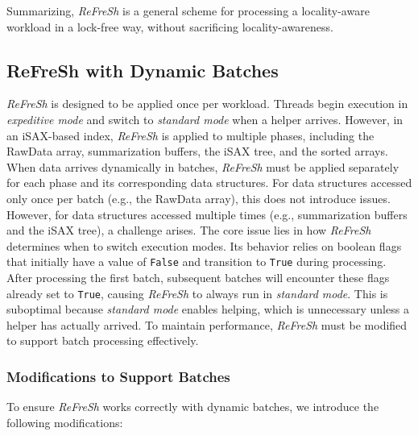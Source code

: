 \documentclass[a4paper,11pt,twoside,openany]{book}
\begin{document}
Summarizing, \textit{ReFreSh} is a general scheme for processing a locality-aware workload in a
lock-free way, without sacrificing locality-awareness. 

\subsection{\textbf{ReFreSh with Dynamic Batches}}  

\textit{ReFreSh} is designed to be applied once per workload. Threads begin execution in 
\textit{expeditive mode} and switch to \textit{standard mode} when a helper arrives. However,
in an iSAX-based index, \textit{ReFreSh} is applied to multiple phases, including the
RawData array, summarization buffers, the iSAX tree, and the sorted arrays.  
When data arrives dynamically in batches, \textit{ReFreSh} must be applied separately for each phase
and its corresponding data structures. For data structures accessed only once per batch (e.g.,
the RawData array), this does not introduce issues. However, for data structures accessed
multiple times (e.g., summarization buffers and the iSAX tree), a challenge arises.  
% 
The core issue lies in how \textit{ReFreSh} determines when to switch execution modes.
Its behavior relies on boolean flags that initially have a value of \texttt{False} and transition
to \texttt{True} during processing. After processing the first batch, subsequent batches will
encounter these flags already set to \texttt{True}, causing \textit{ReFreSh} to always run
in \textit{standard mode}. This is suboptimal because \textit{standard mode} enables helping,
which is unnecessary unless a helper has actually arrived. To maintain performance,
\textit{ReFreSh} must be modified to support batch processing effectively.  

\subsubsection{\textbf{Modifications to Support Batches}}  

To ensure \textit{ReFreSh} works correctly with dynamic batches, we introduce the following
modifications:  
\end{document}
